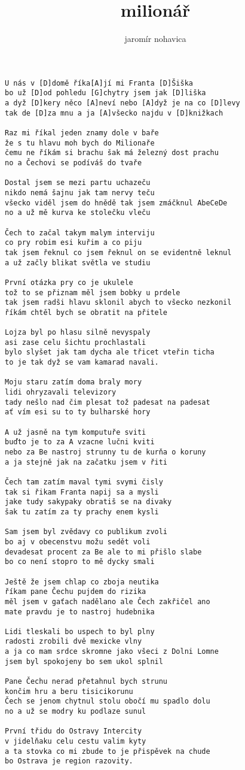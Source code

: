 \author{jaromír nohavica}
\title{milionář}
\maketitle
\begin{verbatim}
U nás v [D]domě říka[A]jí mi Franta [D]Šiška
bo už [D]od pohledu [G]chytry jsem jak [D]liška 
a dyž [D]kery něco [A]neví nebo [A]dyž je na co [D]levy 
tak de [D]za mnu a ja [A]všecko najdu v [D]knižkach 

Raz mi říkal jeden znamy dole v baře
že s tu hlavu moh bych do Milionaře 
čemu ne říkám si brachu šak má železný dost prachu
no a Čechovi se podíváš do tvaře 

Dostal jsem se mezi partu uchazeču
nikdo nemá šajnu jak tam nervy teču 
všecko viděl jsem do hnědě tak jsem zmáčknul AbeCeDe
no a už mě kurva ke stolečku vleču 

Čech to začal takym malym interviju
co pry robim esi kuřim a co piju 
tak jsem řeknul co jsem řeknul on se evidentně leknul
a už začly blikat světla ve studiu 

První otázka pry co je ukulele
tož to se přiznam měl jsem bobky u prdele 
tak jsem radši hlavu sklonil abych to všecko nezkonil
říkám chtěl bych se obratit na přitele 

Lojza byl po hlasu silně nevyspaly
asi zase celu šichtu prochlastali 
bylo slyšet jak tam dycha ale třicet vteřin ticha
to je tak dyž se vam kamarad navali. 

Moju staru zatím doma braly mory
lidi ohryzavali televizory 
tady nešlo nad čim plesat tož padesat na padesat
ať vím esi su to ty bulharské hory 

A už jasně na tym komputuře sviti
buďto je to za A vzacne lučni kviti 
nebo za Be nastroj strunny tu de kurňa o koruny
a ja stejně jak na začatku jsem v řiti 

Čech tam zatím maval tymi svymi čisly
tak si řikam Franta napij sa a mysli 
jake tudy sakypaky obratiš se na divaky
šak tu zatím za ty prachy enem kysli 

Sam jsem byl zvědavy co publikum zvoli
bo aj v obecenstvu možu sedět voli 
devadesat procent za Be ale to mi přišlo slabe
bo co není stopro to mě dycky smali 

Ještě že jsem chlap co zboja neutika
říkam pane Čechu pujdem do rizika 
měl jsem v gaťach nadělano ale Čech zakřičel ano
mate pravdu je to nastroj hudebnika 

Lidi tleskali bo uspech to byl plny
radosti zrobili dvě mexicke vlny 
a ja co mam srdce skromne jako všeci z Dolni Lomne
jsem byl spokojeny bo sem ukol splnil 

Pane Čechu nerad přetahnul bych strunu
končim hru a beru tisicikorunu 
Čech se jenom chytnul stolu obočí mu spadlo dolu
no a už se modry ku podlaze sunul 

První třidu do Ostravy Intercity
v jidelňaku celu cestu valim kyty 
a ta stovka co mi zbude to je přispěvek na chude
bo Ostrava je region razovity.
\end{verbatim}